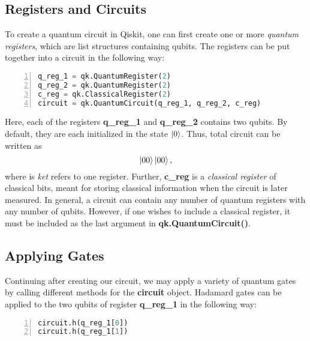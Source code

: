 \subsection{Registers and Circuits}\label{sec:QMLE}

To create a quantum circuit in Qiskit, one can first create one or more \emph{quantum registers}, which are list structures containing qubits. The registers can be put together into a circuit in the following way:

\begin{lstlisting}[language=python, numbers=left]
q_reg_1 = qk.QuantumRegister(2)
q_reg_2 = qk.QuantumRegister(2)
c_reg = qk.ClassicalRegister(2)
circuit = qk.QuantumCircuit(q_reg_1, q_reg_2, c_reg)
\end{lstlisting}
Here, each of the registers \textbf{q\_reg\_1} and \textbf{q\_reg\_2} contains two qubits. By default, they are each initialized in the state $\ket{0}$. Thus, total circuit can be written as
\begin{equation}
    \ket{00}\ket{00},
\end{equation}
where is \emph{ket} refers to one register. Further, \textbf{c\_reg} is a \emph{classical register} of classical bits, meant for storing classical information when the circuit is later measured. In general, a circuit can contain any number of quantum registers with any number of qubits. However, if one wishes to include a classical register, it must be included as the last argument in \textbf{qk.QuantumCircuit()}.

\subsection{Applying Gates}\label{sec:operationsOnQubits}

Continuing after creating our circuit, we may apply a variety of quantum gates by calling different methods for the \textbf{circuit} object. Hadamard gates can be applied to the two qubits of register \textbf{q\_reg\_1} in the following way:

\begin{lstlisting}[language=python, numbers=left]
circuit.h(q_reg_1[0])
circuit.h(q_reg_1[1])
\end{lstlisting}

